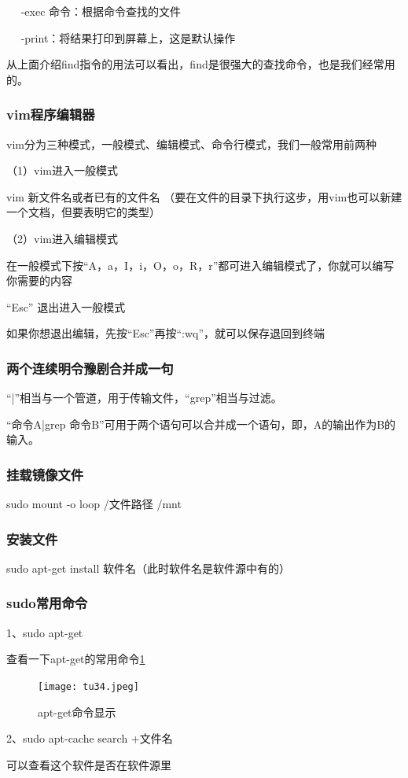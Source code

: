\documentclass{article}
\begin{document}
~~ -exec 命令：根据命令查找的文件

~~ -print：将结果打印到屏幕上，这是默认操作

从上面介绍find指令的用法可以看出，find是很强大的查找命令，也是我们经常用的。
\subsubsection{vim程序编辑器}
vim分为三种模式，一般模式、编辑模式、命令行模式，我们一般常用前两种

（1）vim进入一般模式

vim 新文件名或者已有的文件名  （要在文件的目录下执行这步，用vim也可以新建一个文档，但要表明它的类型）

（2）vim进入编辑模式

在一般模式下按“A，a，I，i，O，o，R，r”都可进入编辑模式了，你就可以编写你需要的内容

“Esc” 退出进入一般模式

如果你想退出编辑，先按“Esc”再按“:wq”，就可以保存退回到终端
\subsubsection{两个连续明令豫剧合并成一句}
“|”相当与一个管道，用于传输文件，“grep”相当与过滤。

“命令A|grep 命令B”可用于两个语句可以合并成一个语句，即，A的输出作为B的输入。

\subsubsection{挂载镜像文件}
sudo mount -o loop /文件路径 /mnt
\subsubsection{安装文件}
sudo apt-get install 软件名（此时软件名是软件源中有的）
\subsubsection{sudo常用命令}
1、sudo apt-get

查看一下apt-get的常用命令\ref{tu34}
\begin{figure}[!htb] %
\centering
\texttt{[image: tu34.jpeg]}
\caption{\small apt-get命令显示}
\label{tu34}
\end{figure} 

2、sudo apt-cache search +文件名

可以查看这个软件是否在软件源里
\end{document}
